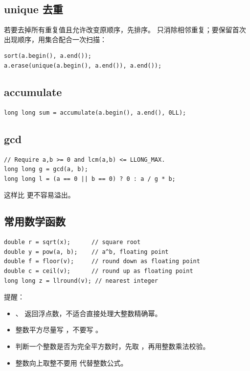 \subsection{unique 去重}

若要去掉所有重复值且允许改变原顺序，先排序。 只消除相邻重复；要保留首次出现顺序，用集合配合一次扫描：

\begin{lstlisting}
sort(a.begin(), a.end());
a.erase(unique(a.begin(), a.end()), a.end());
\end{lstlisting}

\subsection{accumulate}

\begin{lstlisting}
long long sum = accumulate(a.begin(), a.end(), 0LL);
\end{lstlisting}


\subsection{gcd}

\begin{lstlisting}
// Require a,b >= 0 and lcm(a,b) <= LLONG_MAX.
long long g = gcd(a, b);
long long l = (a == 0 || b == 0) ? 0 : a / g * b;
\end{lstlisting}

这样比  更不容易溢出。

\subsection{常用数学函数}

\begin{lstlisting}
double r = sqrt(x);      // square root
double y = pow(a, b);    // a^b, floating point
double f = floor(v);     // round down as floating point
double c = ceil(v);      // round up as floating point
long long z = llround(v); // nearest integer
\end{lstlisting}

提醒：

\begin{itemize}
  \item {}、 返回浮点数，不适合直接处理大整数精确幂。
  \item 整数平方尽量写 ，不要写 。
  \item 判断一个整数是否为完全平方数时，先取 ，再用整数乘法校验。
  \item 整数向上取整不要用  代替整数公式。
\end{itemize}

